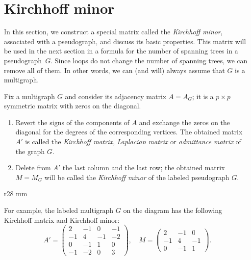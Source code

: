 \section{Kirchhoff minor}

In this section, we construct a special matrix called the \textit{Kirchhoff minor}, associated with a pseudograph,
and discuss its basic properties.
This matrix will be used in the next section in a formula for the number of spanning trees in a pseudograph~$G$.
Since loops do not change the number of spanning trees, we can remove all of them.
In other words, we can (and will) always assume that $G$ is a multigraph. 

Fix a multigraph $G$ and consider its adjacency matrix $A=A_G$;
it is a $p{\times}p$ symmetric matrix with zeros on the diagonal.

\begin{enumerate}
\item Revert the signs of the components of $A$ and exchange the zeros on the diagonal for the degrees of the corresponding vertices. 
The obtained matrix $A'$ is called the \emph{Kirchhoff matrix}, {}\emph{Laplacian matrix} or {}\emph{admittance matrix} of the graph $G$.

\item Delete from $A'$ the last column and the last row;
the obtained matrix $M=M_G$ will be called the \emph{Kirchhoff minor} of the labeled pseudograph $G$.
\end{enumerate}

{

\begin{wrapfigure}{r}{28 mm}
\vskip-4mm
\end{wrapfigure}

For example, the labeled multigraph $G$ on the diagram has the following Kirchhoff matrix and Kirchhoff minor:
\[A'=\left(
\begin{matrix}
2&-1&0&-1
\\
-1&4&-1&-2
\\
0&-1&1&0
\\
-1&-2&0&3
\end{matrix}
\right),
\quad 
M=\left(
\begin{matrix}
2&-1&0
\\
-1&4&-1
\\
0&-1&1
\end{matrix}
\right).\]

}

